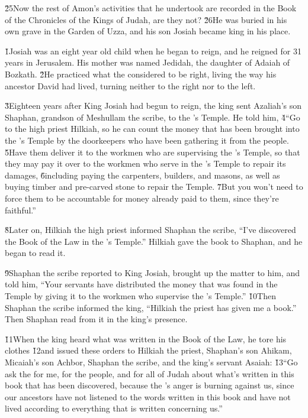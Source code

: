 \v{25}Now the rest of Amon's activities that he undertook are recorded in the Book of the Chronicles of the Kings of Judah, are they not? \v{26}He was buried in his own grave in the Garden of Uzza, and his son Josiah became king in his place.

\v{1}Josiah was an eight year old child when he began to reign, and he reigned for 31 years in Jerusalem. His mother was named Jedidah, the daughter of Adaiah of Bozkath. \v{2}He practiced what the  considered to be right, living the way his ancestor David had lived, turning neither to the right nor to the left.

\v{3}Eighteen years after King Josiah had begun to reign, the king sent Azaliah's son Shaphan, grandson of Meshullam the scribe, to the 's Temple. He told him, \v{4}``Go to the high priest Hilkiah, so he can count the money that has been brought into the 's Temple by the doorkeepers who have been gathering it from the people. \v{5}Have them deliver it to the workmen who are supervising the 's Temple, so that they may pay it over to the workmen who serve in the 's Temple to repair its damages, \v{6}including paying the carpenters, builders, and masons, as well as buying timber and pre-carved stone to repair the Temple. \v{7}But you won't need to force them to be accountable for money already paid to them, since they're faithful.''

\v{8}Later on, Hilkiah the high priest informed Shaphan the scribe, ``I've discovered the Book of the Law in the 's Temple.'' Hilkiah gave the book to Shaphan, and he began to read it.

\v{9}Shaphan the scribe reported to King Josiah, brought up the matter to him, and told him, ``Your servants have distributed the money that was found in the Temple by giving it to the workmen who supervise the 's Temple.'' \v{10}Then Shaphan the scribe informed the king, ``Hilkiah the priest has given me a book.'' Then Shaphan read from it in the king's presence.

\v{11}When the king heard what was written in the Book of the Law, he tore his clothes \v{12}and issued these orders to Hilkiah the priest, Shaphan's son Ahikam, Micaiah's son Achbor, Shaphan the scribe, and the king's servant Asaiah: \v{13}``Go ask the  for me, for the people, and for all of Judah about what's written in this book that has been discovered, because the 's anger is burning against us, since our ancestors have not listened to the words written in this book and have not lived according to everything that is written concerning us.''

